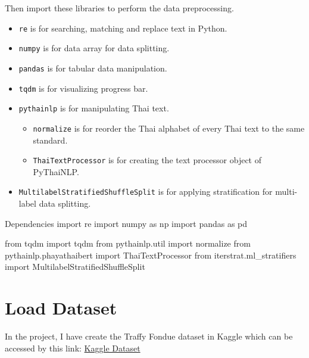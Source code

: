 \documentclass[12pt, a4paper]{article}
\begin{document}
            \noindent Then import these libraries to perform the data preprocessing.
            \begin{itemize}
                \item \texttt{re} is for searching, matching and replace text in Python.
                \item \texttt{numpy} is for data array for data splitting.
                \item \texttt{pandas} is for tabular data manipulation.
                \item \texttt{tqdm} is for visualizing progress bar.
                \item \texttt{pythainlp} is for manipulating Thai text.
                \begin{itemize}
                    \item \texttt{normalize} is for reorder the Thai alphabet of every Thai text to the same standard.
                    \item \texttt{ThaiTextProcessor} is for creating the text processor object of PyThaiNLP.
                \end{itemize}
                \item \texttt{MultilabelStratifiedShuffleSplit} is for applying stratification for multi-label data splitting.
            \end{itemize}

            \begin{codeblock}{Dependencies}
                import re
                import numpy as np
                import pandas as pd

                from tqdm import tqdm
                from pythainlp.util import normalize
                from pythainlp.phayathaibert import ThaiTextProcessor
                from iterstrat.ml_stratifiers import MultilabelStratifiedShuffleSplit
            \end{codeblock}

    \pagebreak

        \section{Load Dataset}
            In the project, I have create the Traffy Fondue dataset in Kaggle which can be accessed by this link:
            \href{https://www.kaggle.com/datasets/worralopsrichainont/2110446-dsde-midterm-dataset-cleaned}{Kaggle Dataset}

            \vspace{0.5em}
\end{document}
